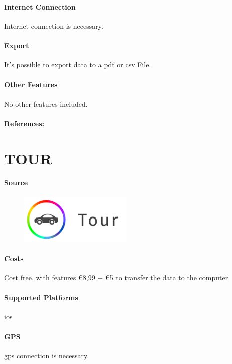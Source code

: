 \paragraph{Internet Connection} Internet connection is necessary.
\paragraph{Export} It’s possible to export data to a \gls{pdf} or \gls{csv} File.
\paragraph{Other Features} No other features included.
\paragraph{References:} \cite{Fahrtenbuch_von_Stefan_Meyer}
\newpage

\section{TOUR}
\paragraph{Source} 
\begin{figure}
  \begin{center}
    \includegraphics[width=0.48\textwidth]{bilder/tour}
  \end{center}
\end{figure}
\paragraph{Costs} Cost free. with features \euro 8,99 + \euro 5 to transfer the data to the computer
\paragraph{Supported Platforms} \gls{ios}
\paragraph{GPS} \gls{gps} connection is necessary.
